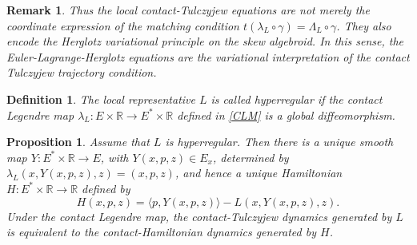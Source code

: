 \documentclass[10pt,a4paper]{amsart}
\newtheorem{proposition}[theorem]{Proposition}
\newtheorem{definition}[theorem]{Definition}
\newtheorem{remark}[theorem]{Remark}
\newcommand{\R}{\mathbb{R}}
\begin{document}
\begin{remark}
Thus the local contact-Tulczyjew equations are not merely the coordinate
expression of the matching condition
$t(\lambda_L\circ\gamma)=\Lambda_L\circ\gamma$. They also encode the Herglotz variational principle on the skew algebroid.
In this sense, the Euler-Lagrange-Herglotz equations are the variational
interpretation of the contact Tulczyjew trajectory condition.
\end{remark}



\begin{definition}
The local representative $L$ is called hyperregular if the contact Legendre map
$\lambda_L:E\times\R\to E^*\times\R$ defined in \eqref{CLM} is a global diffeomorphism.
\end{definition}

\begin{proposition}
\label{prop:hyperregular}
Assume that \(L\) is hyperregular. Then there is a unique smooth map $Y:E^*\times\R\to E$, with \(Y(x,p,z)\in E_x\), determined by
$\lambda_L(x,Y(x,p,z),z)=(x,p,z)$, and hence a unique Hamiltonian \(H:E^*\times\R\to\R\) defined by
\[
H(x,p,z)=\langle p,Y(x,p,z)\rangle-L(x,Y(x,p,z),z).
\]
Under the contact Legendre map, the contact-Tulczyjew dynamics generated
by \(L\) is equivalent to the contact-Hamiltonian dynamics generated by
\(H\).
\end{proposition}
\end{document}
